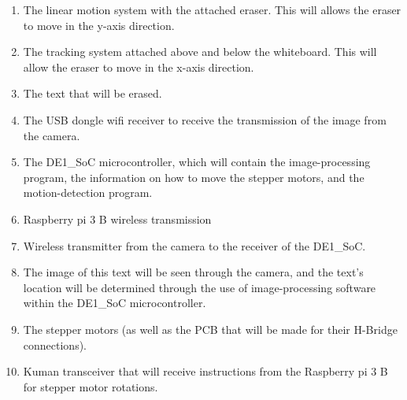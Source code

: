 \begin{enumerate}
	\item The linear motion system with the attached eraser. This will allows the eraser to move in the y-axis direction.
	\item The tracking system attached above and below the whiteboard. This will allow the eraser to move in the x-axis direction.
	\item The text that will be erased. 
	\item The USB dongle wifi receiver to receive the transmission of the image from the camera.
	\item The DE1\_SoC microcontroller, which will contain the image-processing program, the information on how to move the stepper motors, and the motion-detection program.
	\item Raspberry pi 3 B wireless transmission
	\item Wireless transmitter from the camera to the receiver of the DE1\_SoC.
	\item The image of this text will be seen through the camera, and the text’s location will be determined through the use of image-processing software within the DE1\_SoC microcontroller.
	\item The stepper motors (as well as the PCB that will be made for their H-Bridge connections). 
	\item Kuman transceiver that will receive instructions from the Raspberry pi 3 B for stepper motor rotations. \\
\end{enumerate} \par


